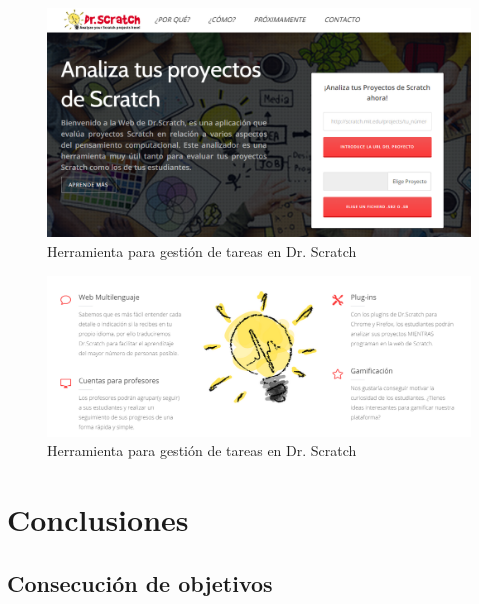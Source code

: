 \documentclass[a4paper, 12pt]{book}
\begin{document}
\begin{figure}
	\graphicspath{{img/}}
  \includegraphics[bb=0 0 800 600, width=12cm, keepaspectratio]{drscratchactual.png}
	\caption{Herramienta para gestión de tareas en Dr. Scratch}
  \label{figura:foro_hilos}
\end{figure}

\begin{figure}
	\graphicspath{{img/}}
  \includegraphics[bb=0 0 800 600, width=12cm, keepaspectratio]{nuevasfuncionalidades.png}
	\caption{Herramienta para gestión de tareas en Dr. Scratch}
  \label{figura:foro_hilos}
\end{figure}





\cleardoublepage
\chapter{Conclusiones}
\label{chap:conclusiones}


\section{Consecución de objetivos}
\label{sec:consecucion-objetivos}
\end{document}
